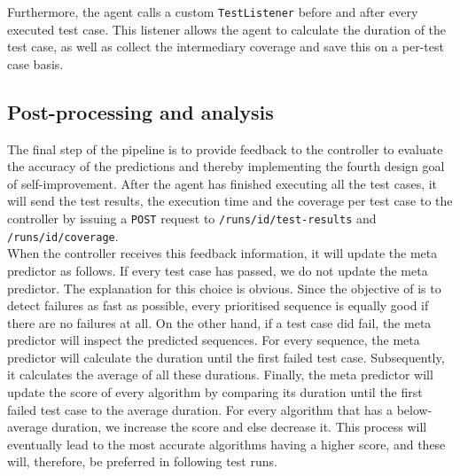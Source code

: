 \noindent Furthermore, the agent calls a custom \texttt{TestListener} before and after every executed test case. This listener allows the agent to calculate the duration of the test case, as well as collect the intermediary coverage and save this on a per-test case basis.

\subsection{Post-processing and analysis}\label{ssec:pipeline-postanalysis}
The final step of the pipeline is to provide feedback to the controller to evaluate the accuracy of the predictions and thereby implementing the fourth design goal of self-improvement. After the agent has finished executing all the test cases, it will send the test results, the execution time and the coverage per test case to the controller by issuing a \texttt{POST} request to \texttt{/runs/id/test-results} and \texttt{/runs/id/coverage}.\\

\noindent When the controller receives this feedback information, it will update the meta predictor as follows. If every test case has passed, we do not update the meta predictor. The explanation for this choice is obvious. Since the objective of \tcp{} is to detect failures as fast as possible, every prioritised sequence is equally good if there are no failures at all. On the other hand, if a test case did fail, the meta predictor will inspect the predicted sequences. For every sequence, the meta predictor will calculate the duration until the first failed test case. Subsequently, it calculates the average of all these durations. Finally, the meta predictor will update the score of every algorithm by comparing its duration until the first failed test case to the average duration. For every algorithm that has a below-average duration, we increase the score and else decrease it. This process will eventually lead to the most accurate algorithms having a higher score, and these will, therefore, be preferred in following test runs.